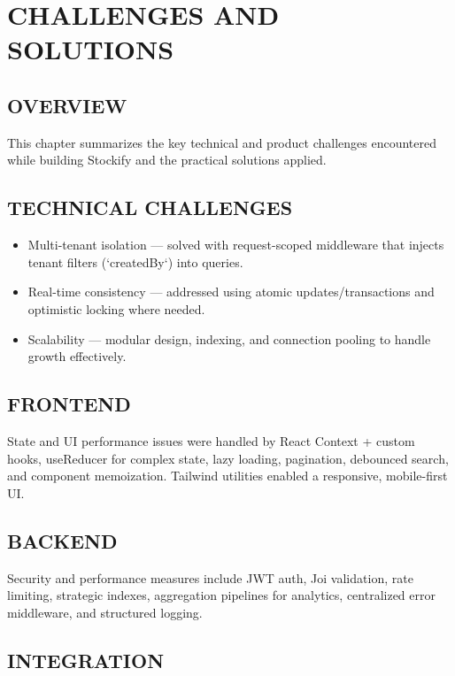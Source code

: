 
\chapter{CHALLENGES AND SOLUTIONS}

\section{OVERVIEW}

This chapter summarizes the key technical and product challenges encountered while building Stockify and the practical solutions applied.

\section{TECHNICAL CHALLENGES}

\begin{itemize}
	\item Multi-tenant isolation — solved with request-scoped middleware that injects tenant filters (`createdBy`) into queries.
	\item Real-time consistency — addressed using atomic updates/transactions and optimistic locking where needed.
	\item Scalability — modular design, indexing, and connection pooling to handle growth effectively.
\end{itemize}

\section{FRONTEND}

State and UI performance issues were handled by React Context + custom hooks, useReducer for complex state, lazy loading, pagination, debounced search, and component memoization. Tailwind utilities enabled a responsive, mobile-first UI.

\section{BACKEND}

Security and performance measures include JWT auth, Joi validation, rate limiting, strategic indexes, aggregation pipelines for analytics, centralized error middleware, and structured logging.

\section{INTEGRATION}

